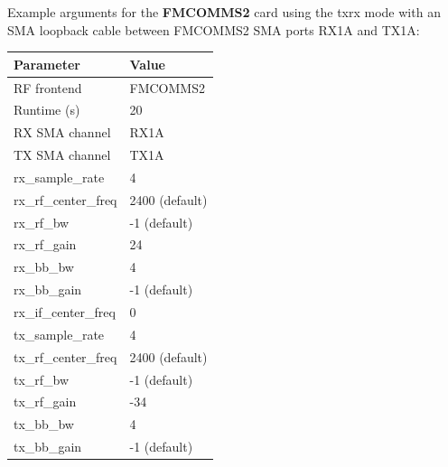 \begin{minipage}{\linewidth}
Example arguments for the \textbf{FMCOMMS2} card using the txrx mode with an SMA loopback cable between FMCOMMS2 SMA ports RX1A and TX1A:\\
\begin{tabular}{|l|l|}
\hline
\rowcolor{blue}
Parameter 	&        Value  	\\
\hline
RF frontend 	&        FMCOMMS2             	\\
\hline
Runtime (s) 	&        20 	        \\
\hline
RX SMA channel 	&        RX1A              	\\
\hline
TX SMA channel 	&        TX1A           	\\
\hline
rx\_sample\_rate 	&4 	                \\
\hline
rx\_rf\_center\_freq 	&2400 (default)  	\\
\hline
rx\_rf\_bw 	&        -1 (default)   \\
\hline
rx\_rf\_gain 	&        24       	\\
\hline
rx\_bb\_bw 	&        4 	        \\
\hline
rx\_bb\_gain 	&        -1 (default) 	\\
\hline
rx\_if\_center\_freq 	&0              	\\
\hline
tx\_sample\_rate 	&4              	\\
\hline
tx\_rf\_center\_freq 	&2400 (default)\\
\hline
tx\_rf\_bw 	&        -1 (default)   \\
\hline
tx\_rf\_gain 	&        -34 	        \\
\hline
tx\_bb\_bw 	&        4        	\\
\hline
tx\_bb\_gain    &       -1 (default) \\
\hline
\end{tabular}
\end{minipage}
\medskip
